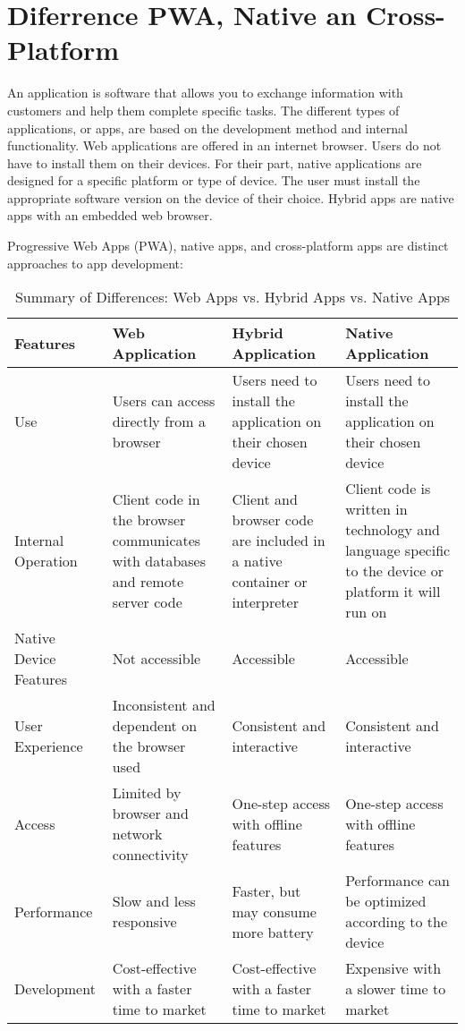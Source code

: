 \documentclass[12pt,a4paper, twosite]{article}
\begin{document}
	\section{Diferrence PWA, Native an Cross-Platform}
	\label{sec:appendices}
	
	An application is software that allows you to exchange information with customers and help them complete specific tasks. The different types of applications, or apps, are based on the development method and internal functionality. Web applications are offered in an internet browser. Users do not have to install them on their devices. For their part, native applications are designed for a specific platform or type of device. The user must install the appropriate software version on the device of their choice. Hybrid apps are native apps with an embedded web browser.

	Progressive Web Apps (PWA), native apps, and cross-platform apps are distinct approaches to app development:
	
\begin{table}[H]  %
	\centering
	\caption{Summary of Differences: Web Apps vs. Hybrid Apps vs. Native Apps}
	\begin{tabular}{|p{2.5cm}|p{4cm}|p{4cm}|p{4cm}|}
		\hline
		\textbf{Features} & \textbf{Web Application} & \textbf{Hybrid Application} & \textbf{Native Application} \\
		\hline
		Use & Users can access directly from a browser & Users need to install the application on their chosen device & Users need to install the application on their chosen device \\
		\hline
		Internal Operation & Client code in the browser communicates with databases and remote server code & Client and browser code are included in a native container or interpreter & Client code is written in technology and language specific to the device or platform it will run on \\
		\hline
		Native Device Features & Not accessible & Accessible & Accessible \\
		\hline
		User Experience & Inconsistent and dependent on the browser used & Consistent and interactive & Consistent and interactive \\
		\hline
		Access & Limited by browser and network connectivity & One-step access with offline features & One-step access with offline features \\
		\hline
		Performance & Slow and less responsive & Faster, but may consume more battery & Performance can be optimized according to the device \\
		\hline
		Development & Cost-effective with a faster time to market & Cost-effective with a faster time to market & Expensive with a slower time to market \\
		\hline
	\end{tabular}
\end{table}
\end{document}
